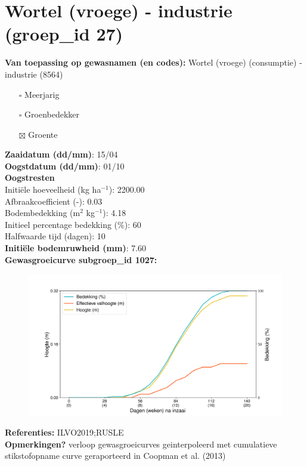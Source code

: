 \documentclass{article}
\begin{document}
 \section{Wortel (vroege) - industrie (groep\_id 27)} 
 \textbf{Van toepassing op gewasnamen (en codes):} Wortel (vroege) (consumptie) - industrie (8564) 
 \begin{multicols}{3} \begin{itemize} \item[$\square$] Meerjarig \item[$\square$] Groenbedekker \item[$\boxtimes$] Groente \end{itemize} \end{multicols} 
  \textbf{Zaaidatum (dd/mm)}: 15/04  \vspace{0.10cm} \\ 
  \textbf{Oogstdatum (dd/mm)}: 01/10  \vspace{0.10cm} \\ 
  \textbf{Oogstresten} \vspace{0.05cm} \\ 
  \tab Initi\"{e}le hoeveelheid (kg ha$^{-1}$): 2200.00 \vspace{0.05cm} \\ 
  \tab Afbraakcoefficient (-): 0.03 \vspace{0.05cm} \\ 
  \tab Bodembedekking (m$^2$ kg$^{-1}$): 4.18 \vspace{0.05cm} \\ 
  \tab Initieel percentage bedekking (\%): 60 \vspace{0.05cm} \\ 
  \tab Halfwaarde tijd (dagen): 10 \vspace{0.05cm} \\ 
  \textbf{Initi\"{e}le bodemruwheid (mm)}: 7.60 \vspace{0.05cm} \\ 
  \textbf{Gewasgroeicurve subgroep\_id 1027:} 
 \begin{center} \begin{figure}[H] \includegraphics[width=12.5cm]{temp/1027.png} \end{figure} \end{center} 
  \textbf{Referenties:} ILVO2019;RUSLE \vspace{0.10cm} \\ 
  \textbf{Opmerkingen?} verloop gewasgroeicurves geinterpoleerd met cumulatieve stikstofopname curve geraporteerd in Coopman et al. (2013) \vspace{0.10cm} \\ 
 \newpage 
\end{document}
